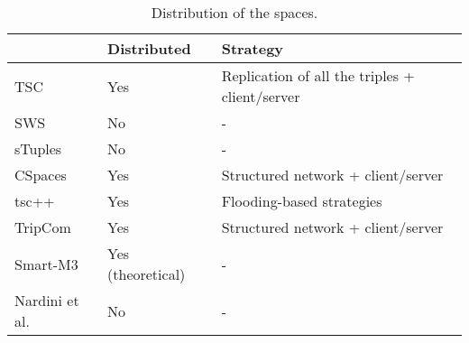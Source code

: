 

\begin{table}[htbp]
\caption{Distribution of the spaces.}


\begin{tabular}{ l p{3cm} p{7cm} }
\hline 
  & Distributed  & Strategy \tabularnewline
\hline 
 TSC & Yes & Replication of all the triples + client/server \tabularnewline %
 SWS &  No & - \tabularnewline
 sTuples & No & - \tabularnewline
 CSpaces & Yes & Structured network + client/server \tabularnewline %
 tsc++ & Yes & Flooding-based strategies \tabularnewline %
 TripCom & Yes & Structured network + client/server \tabularnewline
 Smart-M3 & Yes (theoretical) & - \tabularnewline %
 Nardini et al. & No & - \tabularnewline
\hline 
\end{tabular}
\label{tab:comparisonDistribution}
\end{table}

